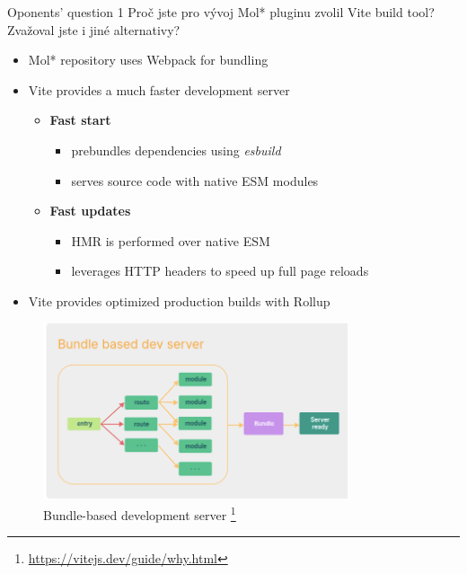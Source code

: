 \documentclass[
]{beamer}
\begin{document}
\begin{frame}{}
  \begin{block}{Oponents' question 1}
    Proč jste pro vývoj Mol* pluginu zvolil Vite build tool? Zvažoval jste i jiné alternativy?
  \end{block}
  \begin{itemize}
    \item Mol* repository uses Webpack for bundling
    \item Vite provides a much faster development server
    \begin{itemize}
      \item \textbf{Fast start}
      \begin{itemize}
          \item prebundles dependencies using \textit{esbuild}
          \item serves source code with native ESM modules
      \end{itemize}
      \item \textbf{Fast updates}
      \begin{itemize}
          \item HMR is performed over native ESM
          \item leverages HTTP headers to speed up full page reloads
      \end{itemize}
    \end{itemize}
    \item Vite provides optimized production builds with Rollup
  \end{itemize}
\end{frame}

\begin{frame}
  \begin{figure}
    \includegraphics[width=0.8\textwidth,height=\textheight,keepaspectratio]{images/bundle_dev_server.png}
    \caption{Bundle-based development server
    \footnote{\url{https://vitejs.dev/guide/why.html}}
  }
  \end{figure}
\end{frame}
\end{document}
